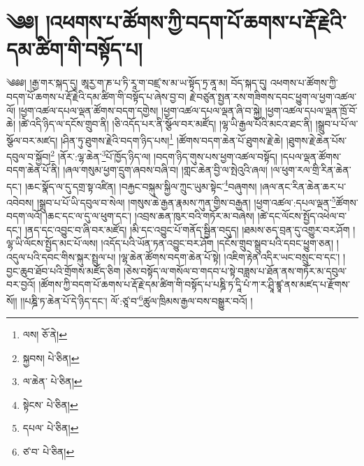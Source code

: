 \setcounter{footnote}{0} 
\chapter{༄༅། །འཕགས་པ་ཚོགས་ཀྱི་བདག་པོ་ཆགས་པ་རྡོ་རྗེའི་དམ་ཚིག་གི་བསྟོད་པ།}༄༅༅། །རྒྱ་གར་སྐད་དུ། ཨཱརྱ་ག་ཎ་པ་ཏི་རཱ་ག་བཛྲ་ས་མ་ཡ་སྟོད་ཏྲ་ནཱ་མ། བོད་སྐད་དུ། འཕགས་པ་ཚོགས་ཀྱི་བདག་པོ་ཆགས་པ་རྡོ་རྗེའི་དམ་ཚིག་གི་བསྟོད་པ་ཞེས་བྱ་བ། རྗེ་བཙུན་སྤྱན་རས་གཟིགས་དབང་ཕྱུག་ལ་ཕྱག་འཚལ་ལོ། །ཕྱག་འཚལ་དཔལ་ལྡན་ཚོགས་བདག་དགྱེས། །ཕྱག་འཚལ་དཔལ་ལྡན་ཞི་བ་སྐྱེ། །ཕྱག་འཚལ་དཔལ་ལྡན་ཁྲོ་བོ་ཆེ། །ཚེ་འདི་ཉིད་ལ་དངོས་གྲུབ་ནི། །ཅི་འདོད་པར་ནི་སྩོལ་བར་མཛོད། །ལྷ་ཡི་རྒྱལ་པོའི་མངའ་ཐང་ནི། །སྒྲུབ་པ་པོ་ལ་སྩོལ་བར་མཛད། །ཤིན་ཏུ་ཐུགས་རྗེའི་བདག་ཉིད་པས།\footnote{ལས།  ཅོ་ནེ། } །ཚོགས་བདག་ཆེན་པོ་ཐུགས་རྗེ་ཆེ། །ཐུགས་རྗེ་ཆེན་པོས་དབུལ་བ་སྐྱོབ།\footnote{སྐྱབས།  པེ་ཅིན། } །ནོར་:ལྷ་ཆེན་\footnote{ལ་ཆེན་  པེ་ཅིན། }པོ་ཁྱོད་ཉིད་ལ། །བདག་ཉིད་གུས་པས་ཕྱག་འཚལ་བསྟོད། །དཔལ་ལྡན་ཚོགས་བདག་ཆེན་པོ་ནི། །ཞལ་གསུམ་ཕྱག་དྲུག་ཞབས་བཞི་བ། །གླང་ཆེན་བྱི་ལ་སྤེའུའི་ཞལ། །ལ་ཕུག་རལ་གྲི་རིན་ཆེན་དང་། །ཆང་སྣོད་ལ་དུ་དགྲ་སྟ་འཛིན། །བརྐྱང་བསྐུམ་སྐྱིལ་ཀྲུང་ཡུམ་སྟེང་\footnote{སྟེངས་  པེ་ཅིན། }བཞུགས། །ཞལ་ནང་རིན་ཆེན་ཆར་པ་འབེབས། །སྒྲུབ་པ་པོ་ཡི་དབུལ་བ་སེལ། །གསུས་ཆེ་རྒྱན་རྣམས་ཀུན་གྱིས་བརྒྱན། །ཕྱག་འཚལ་:དཔལ་ལྡན་\footnote{དཔལ་  པེ་ཅིན། }ཚོགས་བདག་ལའོ། །ཆང་དང་ལ་དུ་ལ་ཕུག་དང་། །འབྲས་ཆན་ཁུར་བའི་གཏོར་མ་བཞེས། །ཚེ་དང་ལོངས་སྤྱོད་འཕེལ་བ་དང་། །ནད་དང་འབྱུང་བ་ཞི་བར་མཛོད། །མི་དང་འབྱུང་པོ་གནོད་སྦྱིན་བདུད། །ཐམས་ཅད་བྲན་དུ་འགྱུར་བར་ཤོག །ལྷ་ཡི་ལོངས་སྤྱོད་མང་པོ་ལས། །འདོད་པའི་ཡོན་ཏན་འབྱུང་བར་ཤོག །དངོས་གྲུབ་སྒྲུབ་པའི་དབང་ཕྱུག་ཅན། །འདུལ་པའི་དབང་གིས་སྐུར་སྤྲུལ་པ། །ལྷ་ཆེན་ཚོགས་བདག་ཆེན་པོ་སྟེ། །འཇིག་རྟེན་འདིར་ཡང་བསྲུང་བ་དང་། །བྱང་ཆུབ་ཐོབ་པའི་གྲོགས་མཛོད་ཅིག །ཅེས་བསྟོད་ལ་གསོལ་བ་གདབ་པ་སྟེ་བཟླས་པ་ཐོན་ནས་གཏོར་མ་དབུལ་བར་བྱའོ། །ཚོགས་ཀྱི་བདག་པོ་ཆགས་པ་རྡོ་རྗེ་དམ་ཚིག་གི་བསྟོད་པ་པཎྜི་ཏ་དཱི་པཾ་ཀ་ར་ཤྲཱི་ཛྙཱ་ནས་མཛད་པ་རྫོགས་སོ།། །།པཎྜི་ཏ་ཆེན་པོ་དེ་ཉིད་དང་། ལོ་:ཙཱ་བ་\footnote{ཙ་བ་  པེ་ཅིན། }ཚུལ་ཁྲིམས་རྒྱལ་བས་བསྒྱུར་བའོ། ། 